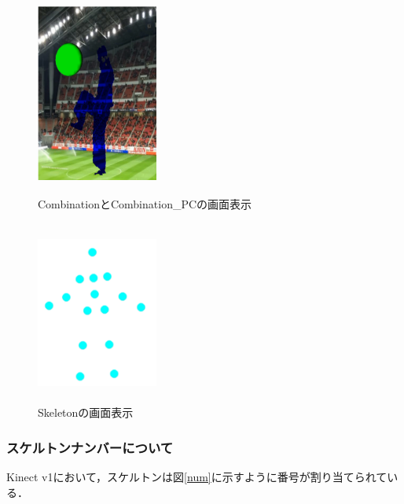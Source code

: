 \begin{figure}[p]
    \begin{minipage}{0.5\hsize}
     \begin{center}
      \includegraphics[width=4cm,height=6cm]{image/Combination.png}
     \end{center}
     \caption{CombinationとCombination\_PCの画面表示}
     \label{combination}
    \end{minipage}
    \begin{minipage}{0.5\hsize}
     \begin{center}
      \includegraphics[width=4cm,height=6cm]{image/Skeleton.png}
     \end{center}
     \caption{Skeletonの画面表示}
     \label{skeleton}
    \end{minipage}
\end{figure}

\clearpage

\subsubsection{スケルトンナンバーについて}
Kinect v1において，スケルトンは図\ref{num}に示すように番号が割り当てられている．

